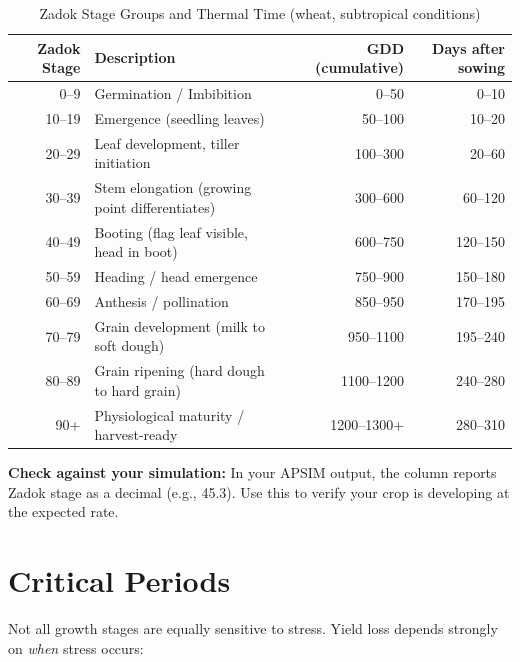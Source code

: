 \begin{table}[H]
\centering
\caption{Zadok Stage Groups and Thermal Time (wheat, subtropical conditions)}
\label{tab:zadok}
\begin{tabularx}{\textwidth}{r|X|r|r}
\toprule
\textbf{Zadok Stage} & \textbf{Description} & \textbf{GDD (cumulative)} & \textbf{Days after sowing} \\
\midrule
0--9  & Germination / Imbibition & 0--50   & 0--10 \\
10--19 & Emergence (seedling leaves) & 50--100  & 10--20 \\
20--29 & Leaf development, tiller initiation & 100--300 & 20--60 \\
30--39 & Stem elongation (growing point differentiates) & 300--600 & 60--120 \\
40--49 & Booting (flag leaf visible, head in boot) & 600--750 & 120--150 \\
50--59 & Heading / head emergence & 750--900 & 150--180 \\
60--69 & Anthesis / pollination & 850--950 & 170--195 \\
70--79 & Grain development (milk to soft dough) & 950--1100 & 195--240 \\
80--89 & Grain ripening (hard dough to hard grain) & 1100--1200 & 240--280 \\
90+   & Physiological maturity / harvest-ready & 1200--1300+ & 280--310 \\
\bottomrule
\end{tabularx}
\end{table}

\begin{tipbox}
\textbf{Check against your simulation:} In your APSIM output, the column  reports Zadok stage as a decimal (e.g., 45.3). Use this to verify your crop is developing at the expected rate.
\end{tipbox}

\section{Critical Periods}

Not all growth stages are equally sensitive to stress. Yield loss depends strongly on \emph{when} stress occurs:

